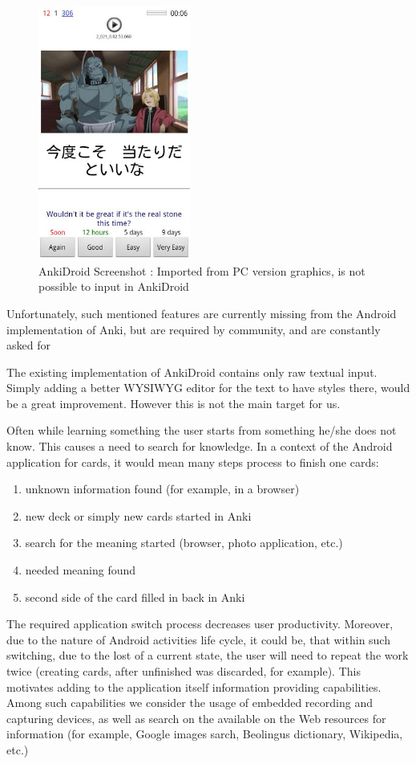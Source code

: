 \documentclass[a4paper,11pt,twoside]{article}
\begin{document}
\begin{figure}[t]
\centering
\label{fig:Graphics}
\includegraphics[width=5cm]{Screenshot1}
\caption{AnkiDroid Screenshot : Imported from PC version graphics, is not possible to input in AnkiDroid}
\end{figure}


Unfortunately, such mentioned features are currently missing from the Android implementation of Anki, but 
are required by community, and are constantly asked for \citet{ankigcode}


The existing implementation of AnkiDroid contains only raw textual input. Simply adding a better WYSIWYG editor 
for the text to have styles there, would be a great improvement. However this is not the main target for us.

Often while learning something the user starts from something he/she does not know. This causes a need to search for
knowledge. In a context of the Android application for cards, it would mean many steps process to finish one cards:

\begin{enumerate}
  \item unknown information found (for example, in a browser)
  \item new deck or simply new cards started in Anki
  \item search for the meaning started (browser, photo application, etc.)
  \item needed meaning found
  \item second side of the card filled in back in Anki
\end{enumerate}

The required application switch process decreases user productivity. Moreover, due to the 
nature of Android activities life cycle, it could be, that within such switching, due to the lost
of a current state, the user will need to repeat the work twice (creating cards, after unfinished was discarded, for example).
This motivates adding to the application itself information providing capabilities. Among such capabilities we 
consider the usage of embedded recording and capturing devices, as well as search on the available on the Web resources
for information (for example, Google images sarch, Beolingus dictionary, Wikipedia, etc.)
\end{document}

